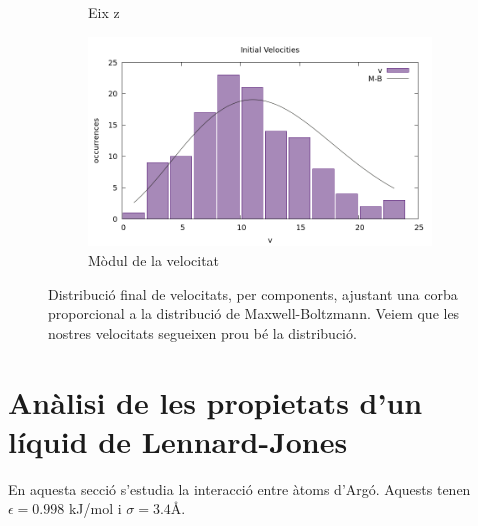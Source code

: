 \documentclass[a4paper,10pt]{article}
\begin{document}
\begin{figure}
\begin{subfigure}{0.45\linewidth}
		\caption{Eix z}
		\label{fig:fin_vel_z_verlet}
	\end{subfigure}
	\begin{subfigure}{0.45\linewidth}	
		\includegraphics[width=\linewidth]{fin_vel_module_verlet} 
		\caption{Mòdul de la velocitat}
		\label{fig:fin_vel_module_verlet}
	\end{subfigure}
	\caption{Distribució final de velocitats, per components, ajustant una corba proporcional a la distribució de Maxwell-Boltzmann. Veiem que les nostres velocitats segueixen prou bé la distribució.}
	\label{fig:fin_vel_verlet}
\end{figure}

\section{Anàlisi de les propietats d'un líquid de Lennard-Jones}
En aquesta secció s'estudia la interacció entre àtoms d'Argó. Aquests tenen $\epsilon = 0.998$ kJ/mol i $\sigma = 3.4 \si{\angstrom}$.



\end{document}
